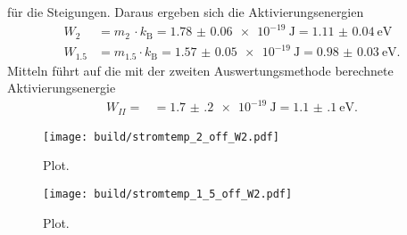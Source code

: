 für die Steigungen. Daraus ergeben sich die Aktivierungsenergien
\begin{align}
  W_{2} &= m_{2} \, \cdot k_\text{B} = \SI{1.78(6)e-19}{\joule} = \SI{1.11(4)}{\electronvolt} \\
  W_{1.5} &= m_{1.5} \cdot k_\text{B} = \SI{1.57(5)e-19}{\joule} = \SI{0.98(3)}{\electronvolt}.
\end{align}
Mitteln führt auf die mit der zweiten Auswertungsmethode berechnete Aktivierungsenergie
\begin{align}
  W_{II} = &= \SI{1.7(2)e-19}{\joule} = \SI{1.1(1)}{\electronvolt}.
\end{align}

\begin{figure}
  \centering
  \texttt{[image: build/stromtemp\_2\_off\_W2.pdf]}
  \caption{Plot.}
  \label{fig:messwerte2offW2}
\end{figure}

\begin{figure}
  \centering
  \texttt{[image: build/stromtemp\_1\_5\_off\_W2.pdf]}
  \caption{Plot.}
  \label{fig:messwerte15offW2}
\end{figure}
